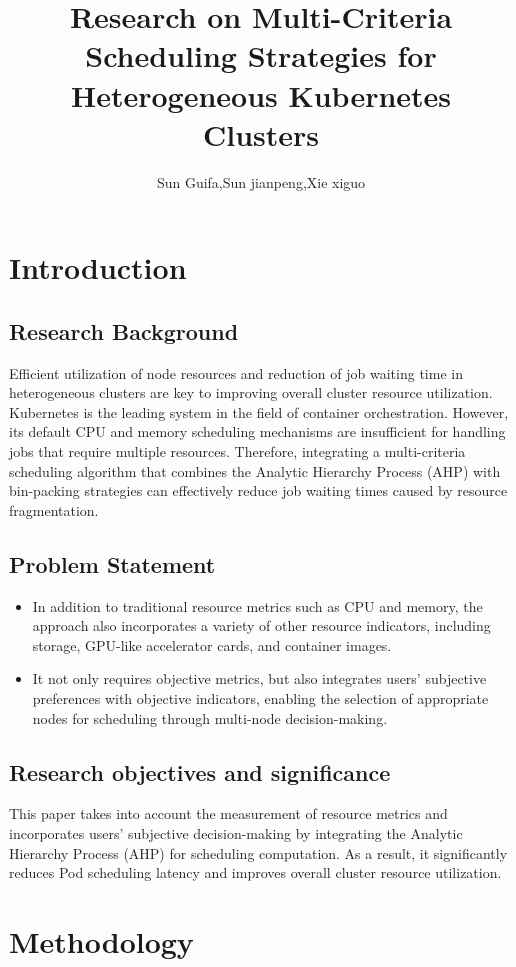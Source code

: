 \documentclass{article}
\title{\textbf{Research on Multi-Criteria Scheduling Strategies for Heterogeneous Kubernetes Clusters}}
\author{Sun Guifa,Sun jianpeng,Xie xiguo}
\begin{document}
\maketitle
\newpage
\section{Introduction}
\subsection{Research Background}
Efficient utilization of node resources and reduction of job waiting time in heterogeneous clusters are key to improving overall cluster resource utilization. Kubernetes is the leading system in the field of container orchestration. However, its default CPU and memory scheduling mechanisms are insufficient for handling jobs that require multiple resources. Therefore, integrating a multi-criteria scheduling algorithm that combines the Analytic Hierarchy Process (AHP) with bin-packing strategies can effectively reduce job waiting times caused by resource fragmentation.
\subsection{Problem Statement}
\begin{itemize}
  \item In addition to traditional resource metrics such as CPU and memory, the approach also incorporates a variety of other resource indicators, including storage, GPU-like accelerator cards, and container images.
  \item It not only requires objective metrics, but also integrates users' subjective preferences with objective indicators, enabling the selection of appropriate nodes for scheduling through multi-node decision-making.
\end{itemize}

\subsection{Research objectives and significance}
This paper takes into account the measurement of resource metrics and incorporates users’ subjective decision-making by integrating the Analytic Hierarchy Process (AHP) for scheduling computation. As a result, it significantly reduces Pod scheduling latency and improves overall cluster resource utilization.

\section{Methodology}
\end{document}

